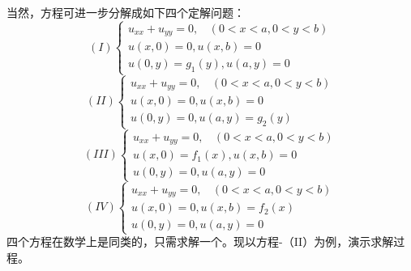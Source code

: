 当然，方程可进一步分解成如下四个定解问题：
	$$\displaystyle  (I) \begin{cases}
		u_{xx} +u_{yy} =0 ,~~~~ (0<x<a, 0<y<b)\\
		u(x,0)= 0,  u(x,b)= 0 \\
		u(0,y)= g_1 (y) ,  u(a,y)= 0
	\end{cases}$$ 
	$$\displaystyle (II)  \begin{cases}
		u_{xx} +u_{yy} =0 ,~~~~ (0<x<a, 0<y<b)\\
		u(x,0)= 0,  u(x,b)= 0 \\
		u(0,y)= 0,  u(a,y)= g_2 (y) 
	\end{cases}$$ 
	$$\displaystyle  (III)  \begin{cases}
		u_{xx} +u_{yy} =0 ,~~~~ (0<x<a, 0<y<b)\\
		u(x,0)= f_1 (x) ,  u(x,b)= 0 \\
		u(0,y)= 0,  u(a,y)= 0 
	\end{cases}$$ 	
	$$\displaystyle  (IV)  \begin{cases}
		u_{xx} +u_{yy} =0 ,~~~~ (0<x<a, 0<y<b)\\
		u(x,0)= 0,  u(x,b)= f_2 (x) \\
		u(0,y)= 0,  u(a,y)= 0 
	\end{cases}$$ 
四个方程在数学上是同类的，只需求解一个。现以方程-（II）为例，演示求解过程。
~~\\ 


